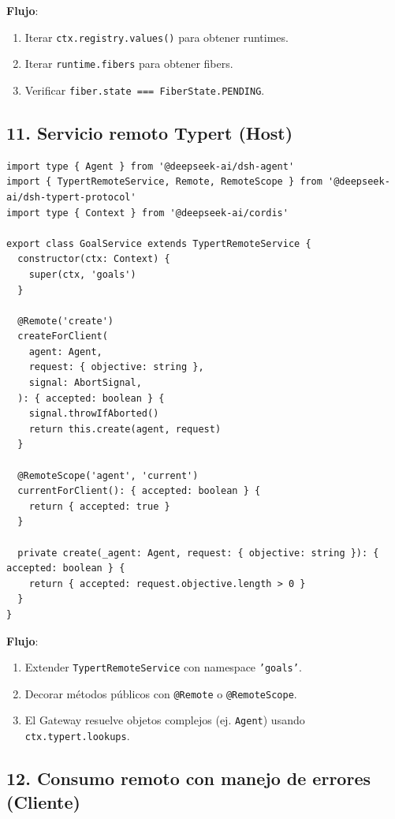 \documentclass[11pt,a4paper]{article}
\begin{document}
\textbf{Flujo}:


\begin{enumerate}[leftmargin=*,topsep=2pt,itemsep=1pt]
  \item Iterar \texttt{ctx.registry.values()} para obtener runtimes.
  \item Iterar \texttt{runtime.fibers} para obtener fibers.
  \item Verificar \texttt{fiber.state === FiberState.PENDING}.
\end{enumerate}


\subsection*{11. Servicio remoto Typert (Host)}


\begin{lstlisting}
import type { Agent } from '@deepseek-ai/dsh-agent'
import { TypertRemoteService, Remote, RemoteScope } from '@deepseek-ai/dsh-typert-protocol'
import type { Context } from '@deepseek-ai/cordis'

export class GoalService extends TypertRemoteService {
  constructor(ctx: Context) {
    super(ctx, 'goals')
  }

  @Remote('create')
  createForClient(
    agent: Agent,
    request: { objective: string },
    signal: AbortSignal,
  ): { accepted: boolean } {
    signal.throwIfAborted()
    return this.create(agent, request)
  }

  @RemoteScope('agent', 'current')
  currentForClient(): { accepted: boolean } {
    return { accepted: true }
  }

  private create(_agent: Agent, request: { objective: string }): { accepted: boolean } {
    return { accepted: request.objective.length > 0 }
  }
}
\end{lstlisting}


\textbf{Flujo}:


\begin{enumerate}[leftmargin=*,topsep=2pt,itemsep=1pt]
  \item Extender \texttt{TypertRemoteService} con namespace \texttt{'goals'}.
  \item Decorar métodos públicos con \texttt{@Remote} o \texttt{@RemoteScope}.
  \item El Gateway resuelve objetos complejos (ej. \texttt{Agent}) usando \texttt{ctx.typert.lookups}.
\end{enumerate}


\subsection*{12. Consumo remoto con manejo de errores (Cliente)}
\end{document}

